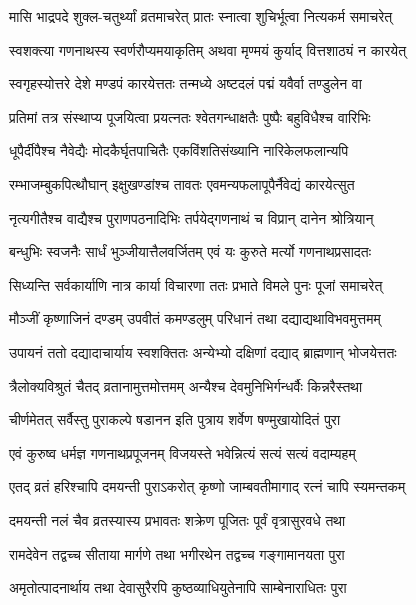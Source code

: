 \twolineshloka
{मासि भाद्रपदे शुक्ल-चतुर्थ्यां व्रतमाचरेत्}
{प्रातः स्नात्वा शुचिर्भूत्वा नित्यकर्म समाचरेत्} %

\twolineshloka
{स्वशक्त्या गणनाथस्य स्वर्णरौप्यमयाकृतिम्}
{अथवा मृण्मयं कुर्याद् वित्तशाठ्यं न कारयेत्} %

\twolineshloka
{स्वगृहस्योत्तरे देशे मण्डपं कारयेत्ततः}
{तन्मध्ये अष्टदलं पद्मं यवैर्वा तण्डुलेन वा} %

\twolineshloka
{प्रतिमां तत्र संस्थाप्य पूजयित्वा प्रयत्नतः}
{श्वेतगन्धाक्षतैः पुष्पैः बहुविधैश्च वारिभिः} %

\twolineshloka
{धूपैर्दीपैश्च नैवेद्यैः मोदकैर्घृतपाचितैः}
{एकविंशतिसंख्यानि नारिकेलफलान्यपि} %

\twolineshloka
{रम्भाजम्बुकपित्थौघान् इक्षुखण्डांश्च तावतः}
{एवमन्यफलापूपैर्नैवेद्यं कारयेत्सुत} %

\twolineshloka
{नृत्यगीतैश्च वाद्यैश्च पुराणपठनादिभिः}
{तर्पयेद्गणनाथं च विप्रान् दानेन श्रोत्रियान्} %

\twolineshloka
{बन्धुभिः स्वजनैः सार्धं भुञ्जीयात्तैलवर्जितम्}
{एवं यः कुरुते मर्त्यो गणनाथप्रसादतः} %

\twolineshloka
{सिध्यन्ति सर्वकार्याणि नात्र कार्या विचारणा}
{ततः प्रभाते विमले पुनः पूजां समाचरेत्} %

\twolineshloka
{मौञ्जीं कृष्णाजिनं दण्डम् उपवीतं कमण्डलुम्}
{परिधानं तथा दद्याद्यथाविभवमुत्तमम्} %

\twolineshloka
{उपायनं ततो दद्यादाचार्याय स्वशक्तितः}
{अन्येभ्यो दक्षिणां दद्याद् ब्राह्मणान् भोजयेत्ततः} %

\twolineshloka
{त्रैलोक्यविश्रुतं चैतद् व्रतानामुत्तमोत्तमम्}
{अन्यैश्च देवमुनिभिर्गन्धर्वैः किन्नरैस्तथा} %

\twolineshloka
{चीर्णमेतत् सर्वैस्तु पुराकल्पे षडानन}
{इति पुत्राय शर्वेण षण्मुखायोदितं पुरा} %

\twolineshloka
{एवं कुरुष्व धर्मज्ञ गणनाथप्रपूजनम्}
{विजयस्ते भवेन्नित्यं सत्यं सत्यं वदाम्यहम्} %

\twolineshloka
{एतद् व्रतं हरिश्चापि दमयन्ती पुराऽकरोत्}
{कृष्णो जाम्बवतीमागाद् रत्नं चापि स्यमन्तकम्} %

\twolineshloka
{दमयन्ती नलं चैव व्रतस्यास्य प्रभावतः}
{शक्रेण पूजितः पूर्वं वृत्रासुरवधे तथा} %

\twolineshloka
{रामदेवेन तद्वच्च सीताया मार्गणे तथा}
{भगीरथेन तद्वच्च गङ्गामानयता पुरा} %

\twolineshloka
{अमृतोत्पादनार्थाय तथा देवासुरैरपि}
{कुष्ठव्याधियुतेनापि साम्बेनाराधितः पुरा} %

